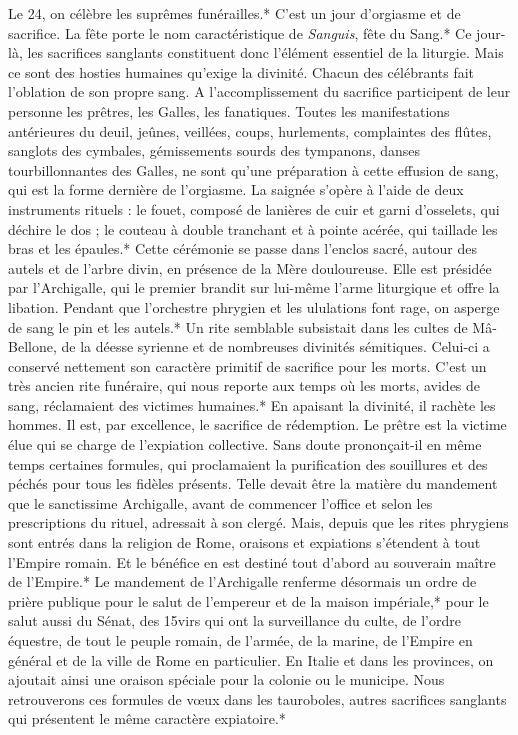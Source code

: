 \documentclass[a4paper, 11pt, oneside, polutonikogreek, french]{article}
\begin{document}
Le 24, on célèbre les suprêmes funérailles.* C'est un jour d'orgiasme et de sacrifice. La fête porte le nom caractéristique de \emph{Sanguis}, fête du Sang.* Ce jour-là, les sacrifices sanglants constituent donc l'élément essentiel de la liturgie. Mais ce sont des hosties humaines qu'exige la divinité. Chacun des célébrants fait l'oblation de son propre sang. A l'accomplissement du sacrifice participent de leur personne les prêtres, les Galles, les fanatiques. Toutes les manifestations antérieures du deuil, jeûnes, veillées, coups, hurlements, complaintes des flûtes, sanglots des cymbales, gémissements sourds des tympanons, danses tourbillonnantes des Galles, ne sont qu'une préparation à cette effusion de sang, qui est la forme dernière de l'orgiasme. La saignée s'opère à l'aide de deux instruments rituels : le fouet, composé de lanières de cuir et garni d'osselets, qui déchire le dos ; le couteau à double tranchant et à pointe acérée, qui taillade les bras et les épaules.* Cette cérémonie se passe dans l'enclos sacré, autour des autels et de l'arbre divin, en présence de la Mère douloureuse. Elle est présidée par l'Archigalle, qui le premier brandit sur lui-même l'arme liturgique et offre la libation. Pendant que l'orchestre phrygien et les ululations font rage, on asperge de sang le pin et les autels.* Un rite semblable subsistait dans les cultes de Mâ-Bellone, de la déesse syrienne et de nombreuses divinités sémitiques. Celui-ci a conservé nettement son caractère primitif de sacrifice pour les morts. C'est un très ancien rite funéraire, qui nous reporte aux temps où les morts, avides de sang, réclamaient des victimes humaines.* En apaisant la divinité, il rachète les hommes. Il est, par excellence, le sacrifice de rédemption. Le prêtre est la victime élue qui se charge de l'expiation collective. Sans doute prononçait-il en même temps certaines formules, qui proclamaient la purification des souillures et des péchés pour tous les fidèles présents. Telle devait être la matière du mandement que le sanctissime Archigalle, avant de commencer l'office et selon les prescriptions du rituel, adressait à son clergé. Mais, depuis que les rites phrygiens sont entrés dans la religion de Rome, oraisons et expiations s'étendent à tout l'Empire romain. Et le bénéfice en est destiné tout d'abord au souverain maître de l'Empire.* Le mandement de l'Archigalle renferme désormais un ordre de prière publique pour le salut de l'empereur et de la maison impériale,* pour le salut aussi du Sénat, des 15virs qui ont la surveillance du culte, de l'ordre équestre, de tout le peuple romain, de l'armée, de la marine, de l'Empire en général et de la ville de Rome en particulier. En Italie et dans les provinces, on ajoutait ainsi une oraison spéciale pour la colonie ou le municipe. Nous retrouverons ces formules de vœux dans les tauroboles, autres sacrifices sanglants qui présentent le même caractère expiatoire.*
\end{document}
